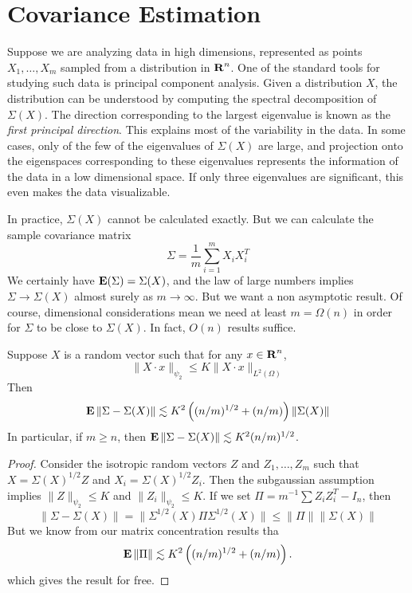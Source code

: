 \section{Covariance Estimation}

Suppose we are analyzing data in high dimensions, represented as points $X_1, \dots, X_m$ sampled from a distribution in $\operatorname{\mathbf{R}}^n$. One of the standard tools for studying such data is principal component analysis. Given a distribution $X$, the distribution can be understood by computing the spectral decomposition of $\Sigma(X)$. The direction corresponding to the largest eigenvalue is known as the \emph{first principal direction}. This explains most of the variability in the data. In some cases, only of the few of the eigenvalues of $\Sigma(X)$ are large, and projection onto the eigenspaces corresponding to these eigenvalues represents the information of the data in a low dimensional space. If only three eigenvalues are significant, this even makes the data visualizable.

In practice, $\Sigma(X)$ cannot be calculated exactly. But we can calculate the sample covariance matrix
%
\[ \Sigma = \frac{1}{m} \sum_{i = 1}^m X_i X_i^T \]
%
We certainly have $\operatorname{\mathbf{E}}(\Sigma) = \Sigma(X)$, and the law of large numbers implies $\Sigma \to \Sigma(X)$ almost surely as $m \to \infty$. But we want a non asymptotic result. Of course, dimensional considerations mean we need at least $m = \Omega(n)$ in order for $\Sigma$ to be close to $\Sigma(X)$. In fact, $O(n)$ results suffice.

\begin{theorem}
	Suppose $X$ is a random vector such that for any $x \in \operatorname{\mathbf{R}}^n$,
	\[ \| X \cdot x \|_{\psi_2} \leq K \| X \cdot x \|_{L^2(\Omega)} \]
	Then
	\[ \operatorname{\mathbf{E}} \| \Sigma - \Sigma(X) \| \lesssim K^2 \left( (n/m)^{1/2} + (n/m) \right) \| \Sigma(X) \| \]
	In particular, if $m \geq n$, then $\operatorname{\mathbf{E}} \| \Sigma - \Sigma(X) \| \lesssim K^2 (n/m)^{1/2}$.
\end{theorem}
\begin{proof}
	Consider the isotropic random vectors $Z$ and $Z_1, \dots, Z_m$ such that $X = \Sigma(X)^{1/2} Z$ and $X_i = \Sigma(X)^{1/2} Z_i$. Then the subgaussian assumption implies $\| Z \|_{\psi_2} \leq K$ and $\| Z_i \|_{\psi_2} \leq K$. If we set $\Pi = m^{-1} \sum Z_i Z_i^T - I_n$, then
	\[ \| \Sigma - \Sigma(X) \| = \| \Sigma^{1/2}(X) \Pi \Sigma^{1/2}(X) \| \leq \| \Pi \| \| \Sigma(X) \| \]
	But we know from our matrix concentration results tha
	\[ \operatorname{\mathbf{E}} \| \Pi \| \lesssim K^2 \left( (n/m)^{1/2} + (n/m) \right). \]
	which gives the result for free.
\end{proof}

